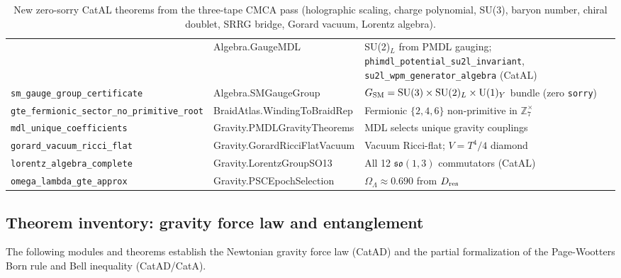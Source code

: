 \documentclass[11pt,a4paper]{article}
\theoremstyle{definition}
\begin{document}
\begin{table}[h]
\begin{tabular}{@{}p{5.2cm}p{4.8cm}p{4.0cm}@{}}
  & Algebra.GaugeMDL
  & SU(2)$_L$ from PMDL gauging; \texttt{phimdl\_\allowbreak potential\_su2l\_\allowbreak invariant}, \texttt{su2l\_\allowbreak wpm\_\allowbreak generator\_\allowbreak algebra} (CatAL) \\[1pt]
\texttt{sm\_\allowbreak gauge\_\allowbreak group\_\allowbreak certificate}
  & Algebra.SMGaugeGroup
  & $G_{\rm SM}=\mathrm{SU}(3)\times\mathrm{SU}(2)_L\times\mathrm{U}(1)_Y$ bundle (zero \texttt{sorry}) \\[1pt]
\texttt{gte\_\allowbreak fermionic\_\allowbreak sector\_\allowbreak no\_\allowbreak primitive\_\allowbreak root}
  & BraidAtlas.WindingToBraidRep
  & Fermionic $\{2,4,6\}$ non-primitive in $\mathbb{Z}_7^\times$ \\[1pt]
\texttt{mdl\_\allowbreak unique\_\allowbreak coefficients}
  & Gravity.PMDLGravityTheorems
  & MDL selects unique gravity couplings \\[1pt]
\texttt{gorard\_\allowbreak vacuum\_\allowbreak ricci\_\allowbreak flat}
  & Gravity.GorardRicciFlatVacuum
  & Vacuum Ricci-flat; $V=T^4/4$ diamond \\[1pt]
\texttt{lorentz\_\allowbreak algebra\_\allowbreak complete}
  & Gravity.LorentzGroupSO13
  & All 12 $\mathfrak{so}(1,3)$ commutators (CatAL) \\[1pt]
\texttt{omega\_\allowbreak lambda\_\allowbreak gte\_\allowbreak approx}
  & Gravity.PSCEpochSelection
  & $\Omega_\Lambda\approx 0.690$ from $D_{\rm res}$ \\
\bottomrule
\end{tabular}
\caption{New zero-sorry CatAL theorems from the three-tape CMCA pass (holographic scaling, charge polynomial, SU(3), baryon number, chiral doublet, SRRG bridge, Gorard vacuum, Lorentz algebra).}
\label{tab:new-theorem-inventory-079}
\end{table}

\subsection{Theorem inventory: gravity force law and entanglement}\label{subsec:new-theorem-inventory-oq1-oq3}

The following modules and theorems establish the
Newtonian gravity force law (CatAD) and the partial formalization of
the Page-Wootters Born rule and Bell inequality (CatAD/CatA).
\end{document}
